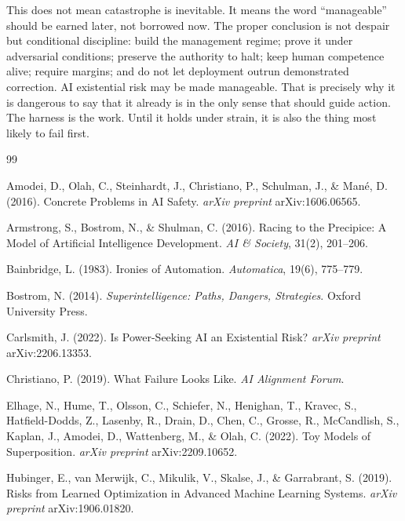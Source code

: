\documentclass[11pt]{article}
\begin{document}
This does not mean catastrophe is inevitable. It means the word ``manageable'' should be earned later, not borrowed now. The proper conclusion is not despair but conditional discipline: build the management regime; prove it under adversarial conditions; preserve the authority to halt; keep human competence alive; require margins; and do not let deployment outrun demonstrated correction. AI existential risk may be made manageable. That is precisely why it is dangerous to say that it already is in the only sense that should guide action. The harness is the work. Until it holds under strain, it is also the thing most likely to fail first.

\begin{thebibliography}{99}
\setlength{\itemsep}{0.25em}

Amodei, D., Olah, C., Steinhardt, J., Christiano, P., Schulman, J., \& Man\'{e}, D. (2016). Concrete Problems in AI Safety. \textit{arXiv preprint} arXiv:1606.06565.

Armstrong, S., Bostrom, N., \& Shulman, C. (2016). Racing to the Precipice: A Model of Artificial Intelligence Development. \textit{AI \& Society}, 31(2), 201--206.

Bainbridge, L. (1983). Ironies of Automation. \textit{Automatica}, 19(6), 775--779.

Bostrom, N. (2014). \textit{Superintelligence: Paths, Dangers, Strategies}. Oxford University Press.

Carlsmith, J. (2022). Is Power-Seeking AI an Existential Risk? \textit{arXiv preprint} arXiv:2206.13353.

Christiano, P. (2019). What Failure Looks Like. \textit{AI Alignment Forum}.

Elhage, N., Hume, T., Olsson, C., Schiefer, N., Henighan, T., Kravec, S., Hatfield-Dodds, Z., Lasenby, R., Drain, D., Chen, C., Grosse, R., McCandlish, S., Kaplan, J., Amodei, D., Wattenberg, M., \& Olah, C. (2022). Toy Models of Superposition. \textit{arXiv preprint} arXiv:2209.10652.

Hubinger, E., van Merwijk, C., Mikulik, V., Skalse, J., \& Garrabrant, S. (2019). Risks from Learned Optimization in Advanced Machine Learning Systems. \textit{arXiv preprint} arXiv:1906.01820.


\end{thebibliography}
\end{document}
